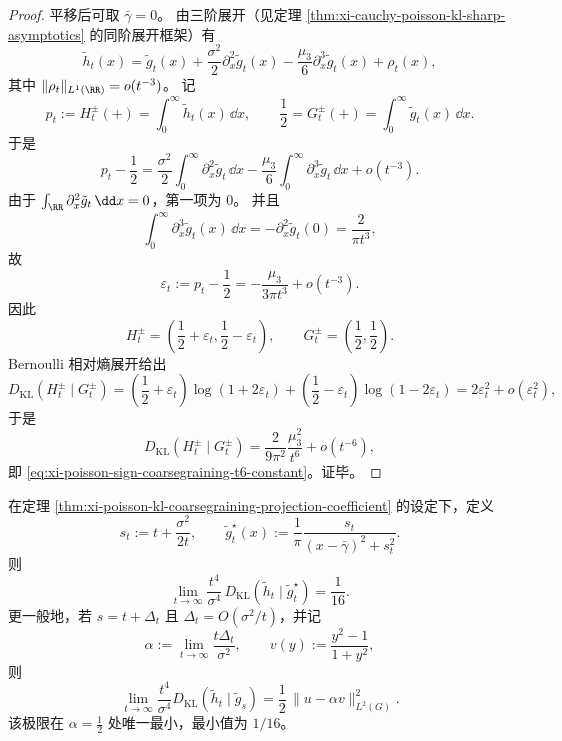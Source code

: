 \begin{proof}
平移后可取 \(\bar\gamma=0\)。
由三阶展开（见定理 \ref{thm:xi-cauchy-poisson-kl-sharp-asymptotics} 的同阶展开框架）有
\[
\tilde h_t(x)
=\tilde g_t(x)+\frac{\sigma^2}{2}\partial_x^2\tilde g_t(x)-\frac{\mu_3}{6}\partial_x^3\tilde g_t(x)+\rho_t(x),
\]
其中 \(\|\rho_t\|_{L^1(\RR)}=o(t^{-3})\)。
记
\[
p_t:=H_t^{\pm}(+)=\int_0^\infty \tilde h_t(x)\,\dd x,\qquad
\frac12=G_t^{\pm}(+)=\int_0^\infty \tilde g_t(x)\,\dd x.
\]
于是
\[
p_t-\frac12
=\frac{\sigma^2}{2}\int_0^\infty \partial_x^2\tilde g_t\,\dd x
-\frac{\mu_3}{6}\int_0^\infty \partial_x^3\tilde g_t\,\dd x
+o(t^{-3}).
\]
由于 \(\int_{\RR}\partial_x^2\tilde g_t\,\dd x=0\)，第一项为 \(0\)。
并且
\[
\int_0^\infty \partial_x^3\tilde g_t(x)\,\dd x
=-\partial_x^2\tilde g_t(0)
=\frac{2}{\pi t^3},
\]
故
\[
\varepsilon_t:=p_t-\frac12
=-\frac{\mu_3}{3\pi t^3}+o(t^{-3}).
\]
因此
\[
H_t^{\pm}=\left(\frac12+\varepsilon_t,\frac12-\varepsilon_t\right),\qquad
G_t^{\pm}=\left(\frac12,\frac12\right).
\]
Bernoulli 相对熵展开给出
\[
D_{\mathrm{KL}}(H_t^{\pm}\mid G_t^{\pm})
=\left(\frac12+\varepsilon_t\right)\log(1+2\varepsilon_t)
+\left(\frac12-\varepsilon_t\right)\log(1-2\varepsilon_t)
=2\varepsilon_t^2+o(\varepsilon_t^2),
\]
于是
\[
D_{\mathrm{KL}}(H_t^{\pm}\mid G_t^{\pm})
=\frac{2}{9\pi^2}\frac{\mu_3^2}{t^6}+o(t^{-6}),
\]
即 \eqref{eq:xi-poisson-sign-coarsegraining-t6-constant}。证毕。
\end{proof}

\begin{theorem}\label{thm:xi-poisson-optimal-cauchy-rescaling-kl-constant}
在定理 \ref{thm:xi-poisson-kl-coarsegraining-projection-coefficient} 的设定下，定义
\[
s_t:=t+\frac{\sigma^2}{2t},\qquad
\tilde g_t^{\star}(x):=\frac{1}{\pi}\frac{s_t}{(x-\bar\gamma)^2+s_t^2}.
\]
则
\begin{equation}\label{eq:xi-poisson-optimal-cauchy-rescaling-kl-constant}
\boxed{
\lim_{t\to\infty}\frac{t^4}{\sigma^4}\,
D_{\mathrm{KL}}(\tilde h_t\mid \tilde g_t^{\star})
=\frac{1}{16}
}.
\end{equation}
更一般地，若 \(s=t+\Delta_t\) 且 \(\Delta_t=O(\sigma^2/t)\)，并记
\[
\alpha:=\lim_{t\to\infty}\frac{t\Delta_t}{\sigma^2},
\qquad
v(y):=\frac{y^2-1}{1+y^2},
\]
则
\[
\lim_{t\to\infty}\frac{t^4}{\sigma^4}D_{\mathrm{KL}}(\tilde h_t\mid \tilde g_s)
=\frac12\,\|u-\alpha v\|_{L^2(G)}^2.
\]
该极限在 \(\alpha=\frac12\) 处唯一最小，最小值为 \(1/16\)。
\end{theorem}

